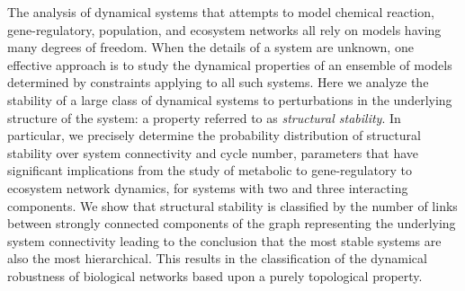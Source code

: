 The analysis of dynamical systems that attempts to model chemical reaction, gene-regulatory, population, and ecosystem networks all rely on models having many degrees of freedom. When the details of a system are unknown, one effective approach is to study the dynamical properties of an ensemble of models determined by constraints applying to all such systems. Here we analyze the stability of a large class of dynamical systems to perturbations in the underlying structure of the system: a property referred to as \emph{structural stability}. In particular, we precisely determine the probability distribution of structural stability over system connectivity and cycle number, parameters that have significant implications from the study of metabolic to gene-regulatory to ecosystem network dynamics, for systems with two and three interacting components. We show that structural stability is classified by the number of links between strongly connected components of the graph representing the underlying system connectivity leading to the conclusion that the most stable systems are also the most hierarchical. This results in the classification of the dynamical robustness of biological networks based upon a purely topological property.
